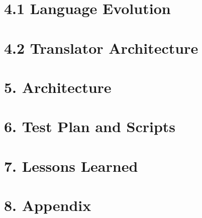 \documentclass[11pt]{article}
\begin{document}
\section*{4.1 Language Evolution}

\newpage

\section*{4.2 Translator Architecture}

\newpage

\section*{5. Architecture}

\newpage

\section*{6. Test Plan and Scripts}
% 
\newpage

\section*{7. Lessons Learned}

\newpage

\section*{8. Appendix}

\newpage
\end{document}
